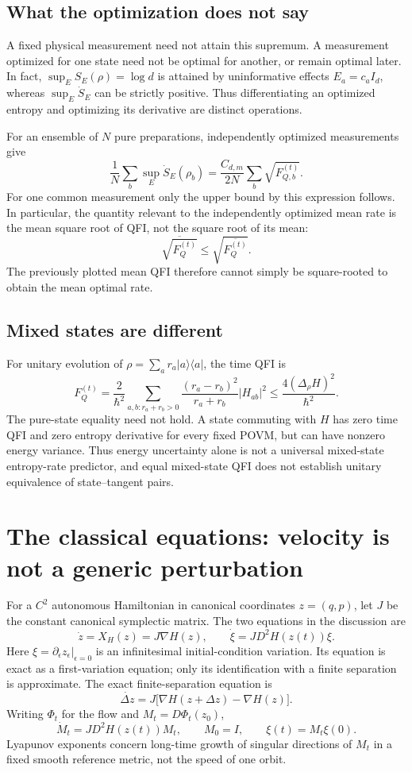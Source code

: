 \documentclass[11pt,a4paper]{article}
\begin{document}
\subsection{What the optimization does not say}
A fixed physical measurement need not attain this supremum. A measurement optimized for one state need not be optimal for another, or remain optimal later. In fact, $\sup_ES_E(\rho)=\log d$ is attained by uninformative effects $E_a=c_aI_d$, whereas $\sup_E\dot S_E$ can be strictly positive. Thus differentiating an optimized entropy and optimizing its derivative are distinct operations.

For an ensemble of $N$ pure preparations, independently optimized measurements give
\[\frac1N\sum_b\sup_E\dot S_E(\rho_b)=\frac{C_{d,m}}{2N}\sum_b\sqrt{F_{Q,b}^{(t)}}.\]
For one common measurement only the upper bound by this expression follows. In particular, the quantity relevant to the independently optimized mean rate is the mean square root of QFI, not the square root of its mean:
\[\overline{\sqrt{F_Q^{(t)}}}\le\sqrt{\overline{F_Q^{(t)}}}.\]
The previously plotted mean QFI therefore cannot simply be square-rooted to obtain the mean optimal rate.

\subsection{Mixed states are different}
For unitary evolution of $\rho=\sum_a r_a|a\rangle\langle a|$, the time QFI is
\[F_Q^{(t)}=\frac{2}{\hbar^2}\sum_{a,b:r_a+r_b>0}\frac{(r_a-r_b)^2}{r_a+r_b}|H_{ab}|^2\le\frac{4(\Delta_\rho H)^2}{\hbar^2}.\]
The pure-state equality need not hold. A state commuting with $H$ has zero time QFI and zero entropy derivative for every fixed POVM, but can have nonzero energy variance. Thus energy uncertainty alone is not a universal mixed-state entropy-rate predictor, and equal mixed-state QFI does not establish unitary equivalence of state--tangent pairs.

\section{The classical equations: velocity is not a generic perturbation}
For a $C^2$ autonomous Hamiltonian in canonical coordinates $z=(q,p)$, let $J$ be the constant canonical symplectic matrix. The two equations in the discussion are
\[\dot z=X_H(z)=J\nabla H(z),\qquad\dot\xi=J D^2H(z(t))\xi.\]
Here $\xi=\partial_\epsilon z_\epsilon|_{\epsilon=0}$ is an infinitesimal initial-condition variation. Its equation is exact as a first-variation equation; only its identification with a finite separation is approximate. The exact finite-separation equation is
\[\dot{\Delta z}=J\bigl[\nabla H(z+\Delta z)-\nabla H(z)\bigr].\]
Writing $\Phi_t$ for the flow and $M_t=D\Phi_t(z_0)$,
\[\dot M_t=J D^2H(z(t))M_t,\qquad M_0=I,\qquad\xi(t)=M_t\xi(0).\]
Lyapunov exponents concern long-time growth of singular directions of $M_t$ in a fixed smooth reference metric, not the speed of one orbit.
\end{document}
